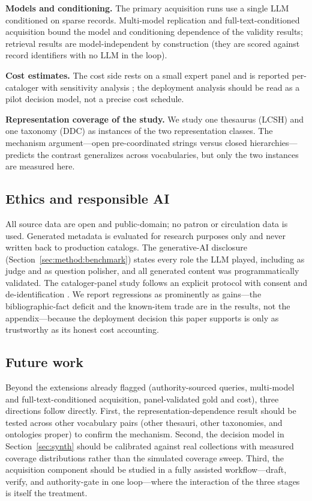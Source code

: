 \textbf{Models and conditioning.} The primary acquisition runs use a single
LLM conditioned on sparse records. Multi-model replication and
full-text-conditioned acquisition  bound the model and conditioning
dependence of the validity results; retrieval results are
model-independent by construction (they are scored against record
identifiers with no LLM in the loop).

\textbf{Cost estimates.} The cost side rests on a small expert panel and is
reported per-cataloger with sensitivity analysis ; the deployment
analysis should be read as a pilot decision model, not a precise
cost schedule.

\textbf{Representation coverage of the study.} We study one thesaurus
(LCSH) and one taxonomy (DDC) as instances of the two representation
classes. The mechanism argument---open pre-coordinated strings versus
closed hierarchies---predicts the contrast generalizes across vocabularies,
but only the two instances are measured here.

\subsection{Ethics and responsible AI}

All source data are open and public-domain; no patron or circulation data
is used. Generated metadata is evaluated for research purposes only and
never written back to production catalogs. The generative-AI disclosure
(Section~\ref{sec:method:benchmark}) states every role the LLM played,
including as judge and as question polisher, and all generated content was
programmatically validated. The cataloger-panel study follows an explicit
protocol with consent and de-identification . We report regressions as prominently as gains---the
bibliographic-fact deficit and the known-item trade are in the results, not
the appendix---because the deployment decision this paper supports is only
as trustworthy as its honest cost accounting.

\subsection{Future work}

Beyond the extensions already flagged (authority-sourced queries,
multi-model and full-text-conditioned acquisition, panel-validated gold and
cost), three directions follow directly. First, the representation-dependence
result should be tested across other vocabulary pairs (other thesauri,
other taxonomies, and ontologies proper) to confirm the mechanism.
Second, the decision model in Section~\ref{sec:synth} should be calibrated
against real collections with measured coverage distributions rather than
the simulated coverage sweep. Third, the acquisition component should be
studied in a fully assisted workflow---draft, verify, and authority-gate in
one loop---where the interaction of the three stages is itself the
treatment.
